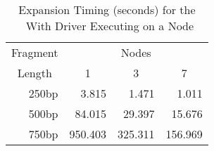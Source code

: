 \begin{table}[bth]
\caption{Expansion Timing (seconds) for the \gamma\ With Driver Executing on
a Node}
\label{'gamma2'}
\begin{center}
\begin{tabular}{||r|rrr||}  \hline
\multicolumn{1}{||c|}{Fragment} & \multicolumn{3}{c||}{Nodes} \\ 
\multicolumn{1}{||c|}{Length} & \multicolumn{1}{c}{1} & \multicolumn{1}{c}{3} &
\multicolumn{1}{c||}{7} \\ \hline
250bp &   3.815 &   1.471 &   1.011 \\
500bp &  84.015 &  29.397 &  15.676 \\
750bp & 950.403 & 325.311 & 156.969 \\ \hline
\end{tabular}
\end{center}
\end{table}
